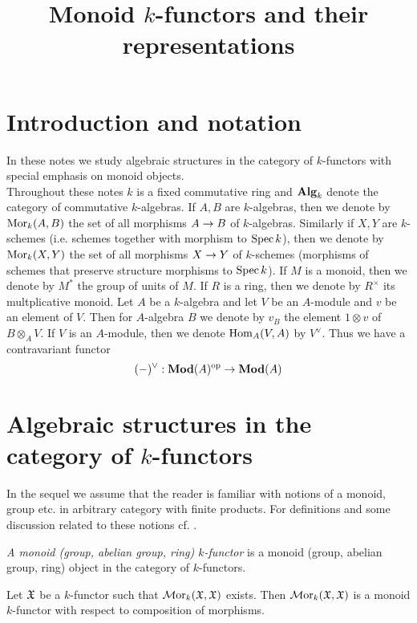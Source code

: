 



\title{Monoid $k$-functors and their representations}
\date{}
\maketitle

\section{Introduction and notation}
\noindent
In these notes we study algebraic structures in the category of $k$-functors with special emphasis on monoid objects.\\
Throughout these notes $k$ is a fixed commutative ring and $\mathbf{Alg}_k$ denote the category of commutative $k$-algebras. If $A, B$ are $k$-algebras, then we denote by $\mathrm{Mor}_k(A, B)$ the set of all morphisms $A\rightarrow B$ of $k$-algebras. Similarly if $X, Y$ are $k$-schemes (i.e. schemes together with morphism to $\mathrm{Spec}\, k$), then we denote by $\mathrm{Mor}_k(X,Y)$ the set of all morphisms $X\rightarrow Y$ of $k$-schemes (morphisms of schemes that preserve structure morphisms to $\mathrm{Spec}\, k$). If $M$ is a monoid, then we denote by $M^*$ the group of units of $M$. If $R$ is a ring, then we denote by $R^{\times}$ its multplicative monoid. Let $A$ be a $k$-algebra and let $V$ be an $A$-module and $v$ be an element of $V$. Then for $A$-algebra $B$ we denote by $v_B$ the element $1\otimes v$ of $B\otimes_AV$. If $V$ is an $A$-module, then we denote $\mathrm{Hom}_A(V,A)$ by $V^{\vee}$. Thus we have a contravariant functor
$$(-)^{\vee}:\mathbf{Mod}(A)^{\mathrm{op}}\rightarrow \mathbf{Mod}(A)$$


\section{Algebraic structures in the category of $k$-functors}
\noindent
In the sequel we assume that the reader is familiar with notions of a monoid, group etc. in arbitrary category with finite products. For definitions and some discussion related to these notions cf. {\cite[pages 2-5]{Maclane}}.

\begin{definition}
\textit{A monoid (group, abelian group, ring) $k$-functor} is a monoid (group, abelian group, ring) object in the category of $k$-functors.
\end{definition}

\begin{example}\label{example:endomorphisms_of_k_functor}
Let ${\mathfrak X}$ be a $k$-functor such that $\mathcal{M}\mathrm{or}_k({\mathfrak X},{\mathfrak X})$ exists. Then $\mathcal{M}\mathrm{or}_k({\mathfrak X},{\mathfrak X})$ is a monoid $k$-functor with respect to composition of morphisms.
\end{example}

